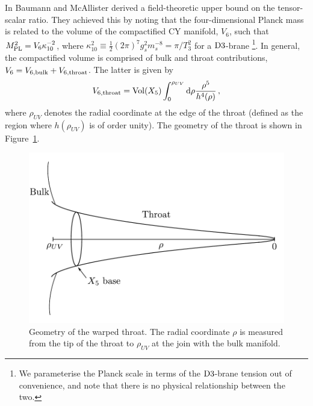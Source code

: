 In  Baumann and McAllister
derived a field-theoretic upper bound on the tensor-scalar ratio. They achieved
this by noting that the four-dimensional Planck mass is related 
to the volume of the compactified CY manifold, $V_6$, such that 
$M_{\mathrm{PL}}^2=V_6 \kappa_{10}^{-2}$, where $\kappa_{10}^2 \equiv 
\frac{1}{2} (2\pi )^7 g_s^2 m_s^{-8} = \pi /T_3^{2}$ for a 
${\rm D3}$-brane \footnote{We parameterise the Planck scale 
in terms of the ${\rm D3}$-brane tension out of convenience, 
and note that there is no physical relationship between the two.}.
In general, the compactified volume 
is comprised of bulk and throat contributions, 
$V_6 = V_{6,{\rm bulk}}+V_{6,{\rm throat}}$. The latter is 
given by
% 
\begin{equation}
\label{eq:throatvolume}
V_{6,\mathrm{throat}} = \mathrm{Vol}(X_5)  
\int_0^{\rho_{UV}} \mathrm{d}\rho \frac{\rho^5}{h^4(\rho )} \,,
\end{equation}
% 
where $\rho_{UV}$ denotes the radial coordinate at 
the edge of the throat (defined as the region 
where $h (\rho_{UV})$ is of order unity). The geometry of the throat is shown
in Figure~\ref{fig:throat-geom}.

% 
\begin{figure}[htbp]
 \centering
 \includegraphics[width=\textwidth]{./dbi/graphs/throat-geom.pdf}
 \caption[Warped Throat Geometry]{Geometry of the warped throat. The radial
coordinate $\rho$ is measured from the tip of the throat to $\rho_{UV}$ at the join
with the bulk manifold.}
 \label{fig:throat-geom}
\end{figure}

% 

